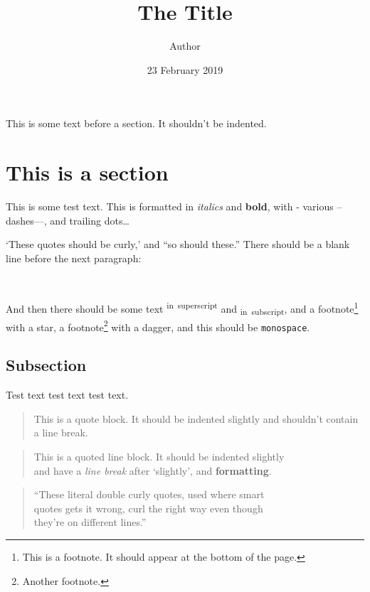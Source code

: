\documentclass[
  12pt,
  british,
  a4paper,
]{article}
\title{The Title}
\author{Author}
\date{23 February 2019}
\newif\iffootnote
\let\Footnote\footnote
\renewcommand\footnote[1]{\begingroup\footnotetrue\Footnote{#1}\endgroup}
\begin{document}
\maketitle

\frenchspacing


\noindent{}This is some text before a section. It shouldn't be indented.

\hypertarget{this-is-a-section}{%
\section{This is a section}\label{this-is-a-section}}

This is some test text. This is formatted in \emph{italics} and
\textbf{bold}, with - various -- dashes---, and trailing dots\ldots{}

`These quotes should be curly,' and ``so should these.'' There should be
a blank line before the next paragraph:

~

And then there should be some text \textsuperscript{in~superscript} and
\textsubscript{in~subscript}, and a footnote\footnote{This is a
  footnote. It should appear at the bottom of the page.} with a star, a
footnote\footnote{Another footnote.} with a dagger, and this should be
\texttt{monospace}.

\hypertarget{subsection}{%
\subsection{Subsection}\label{subsection}}

Test text test text test text.

\begin{quote}
This is a quote block. It should be indented slightly and shouldn't
contain a line break.
\end{quote}

\begin{quote}
This is a quoted line block. It should be indented slightly\\
and have a \emph{line break} after `slightly', and \textbf{formatting}.
\end{quote}

\begin{quote}
``These literal double curly quotes, used where smart\\
quotes gets it wrong, curl the right way even though\\
they're on different lines.''
\end{quote}
\end{document}
